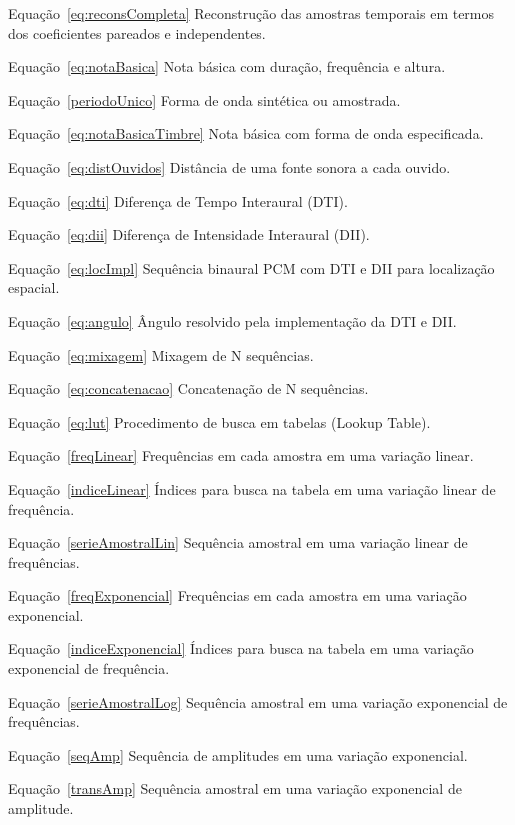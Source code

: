\begin{listaespecial}[BIGNAMEWIDTH]
        \item[Equação~\ref{eq:reconsCompleta}] Reconstrução das amostras temporais em termos dos coeficientes pareados e independentes.
        \item[Equação~\ref{eq:notaBasica}] Nota básica com duração, frequência e altura.
        \item[Equação~\ref{periodoUnico}] Forma de onda sintética ou amostrada.
        \item[Equação~\ref{eq:notaBasicaTimbre}] Nota básica com forma de onda especificada.
        \item[Equação~\ref{eq:distOuvidos}] Distância de uma fonte sonora a cada ouvido.
        \item[Equação~\ref{eq:dti}] Diferença de Tempo Interaural (DTI).
        \item[Equação~\ref{eq:dii}] Diferença de Intensidade Interaural (DII).
        \item[Equação~\ref{eq:locImpl}] Sequência binaural PCM com  DTI e DII para localização espacial.
        \item[Equação~\ref{eq:angulo}] Ângulo resolvido pela implementação da DTI e DII.
        \item[Equação~\ref{eq:mixagem}] Mixagem de N sequências.
        \item[Equação~\ref{eq:concatenacao}] Concatenação de N sequências.
        \item[Equação~\ref{eq:lut}] Procedimento de busca em tabelas (Lookup Table).
        \item[Equação~\ref{freqLinear}] Frequências em cada amostra em uma variação linear.
        \item[Equação~\ref{indiceLinear}] Índices para busca na tabela em uma variação linear de frequência.
        \item[Equação~\ref{serieAmostralLin}] Sequência amostral em uma variação linear de frequências.
        \item[Equação~\ref{freqExponencial}] Frequências em cada amostra em uma variação exponencial.
        \item[Equação~\ref{indiceExponencial}] Índices para busca na tabela em uma variação exponencial de frequência.
        \item[Equação~\ref{serieAmostralLog}] Sequência amostral em uma variação exponencial de frequências.
        \item[Equação~\ref{seqAmp}] Sequência de amplitudes em uma variação exponencial.
        \item[Equação~\ref{transAmp}] Sequência amostral em uma variação exponencial de amplitude.

\end{listaespecial}
